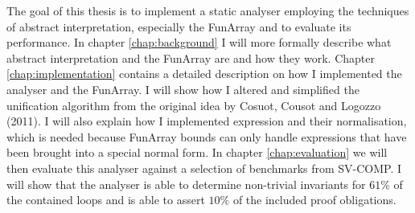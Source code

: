 The goal of this thesis is to implement a static analyser employing the techniques of abstract interpretation, especially the FunArray and to evaluate its performance. In chapter \ref{chap:background} I will more formally describe what abstract interpretation and the FunArray are and how they work. Chapter \ref{chap:implementation} contains a detailed description on how I implemented the analyser and the FunArray. I will show how I altered and simplified the unification algorithm from the original idea by Cosuot, Cousot and Logozzo (2011). I will also explain how I implemented expression and their normalisation, which is needed because FunArray bounds can only handle expressions that have been brought into a special normal form. In chapter \ref{chap:evaluation} we will then evaluate this analyser against a selection of benchmarks from SV-COMP. I will show that the analyser is able to determine non-trivial invariants for $61\%$ of the contained loops and is able to assert $10\%$ of the included proof obligations.



















 